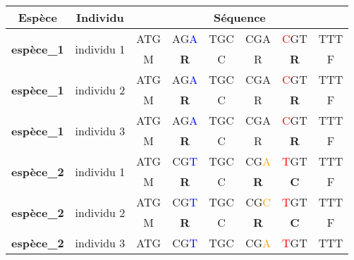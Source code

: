 \documentclass[../main]{subfiles} %
\begin{document}



\begin{table}[]
    \centering
    \begin{tabular}{cccccccc}
        \toprule
        \textbf{Espèce}                     & \textbf{Individu}             & \multicolumn{6}{c}{\textbf{Séquence}} \\
        \midrule
        \multirow{2}{*}{\textbf{espèce\_1}} & \multirow{2}{*}{individu 1} & ATG  & AG\textcolor{blue}{A}  & TGC  & CGA  & \textcolor{red}{C}GT & TTT \\
                                            &                               & M    & \textbf{R}    & C    & R    & \textbf{R}   & F   \\
        \midrule
        \multirow{2}{*}{\textbf{espèce\_1}} & \multirow{2}{*}{individu 2}   & ATG  & AG\textcolor{blue}{A} & TGC  & CGA  & \textcolor{red}{C}GT & TTT \\
                                            &                               & M    & \textbf{R}    & C    & R    & \textbf{R}   & F   \\
        \midrule
        \multirow{2}{*}{\textbf{espèce\_1}} & \multirow{2}{*}{individu 3}   & ATG  & AG\textcolor{blue}{A}  & TGC  & CGA  & \textcolor{red}{C}GT & TTT \\
                                            &                               & M    & \textbf{R}    & C    & R    & \textbf{R}   & F   \\
        \midrule
        \multirow{2}{*}{\textbf{espèce\_2}} & \multirow{2}{*}{individu 1}   & ATG  & CG\textcolor{blue}{T}  & TGC  & CG\textcolor{orange}{A}  & \textcolor{red}{T}GT & TTT \\
                                            &                               & M    & \textbf{R}    & C    & \textbf{R}    & \textbf{C}   & F   \\
        \midrule
        \multirow{2}{*}{\textbf{espèce\_2}} & \multirow{2}{*}{individu 2}   & ATG  & CG\textcolor{blue}{T}  & TGC  & CG\textcolor{orange}{C}  & \textcolor{red}{T}GT & TTT \\
                                            &                               & M    & \textbf{R}    & C    & \textbf{R}    & \textbf{C}   & F   \\
        \midrule
        \multirow{2}{*}{\textbf{espèce\_2}} & \multirow{2}{*}{individu 3}   & ATG  & CG\textcolor{blue}{T}  & TGC  & CG\textcolor{orange}{A}  & \textcolor{red}{T}GT & TTT \\

\end{tabular}
\end{table}
\end{document}
